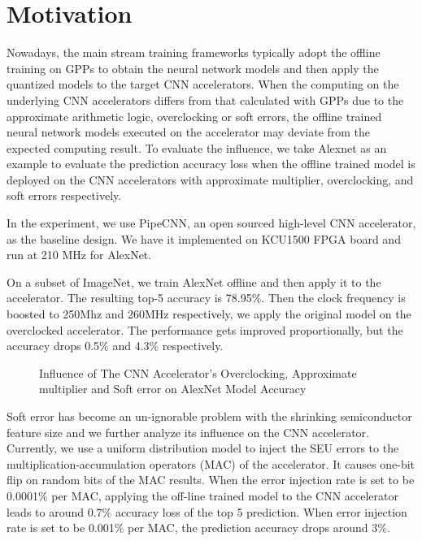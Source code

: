\section{Motivation} \label{sec:motivation}
Nowadays, the main stream training frameworks typically adopt the offline training
on GPPs to obtain the neural network models and then apply the quantized models to the 
target CNN accelerators. When the computing on the underlying CNN accelerators differs
from that calculated with GPPs due to the approximate arithmetic logic, overclocking or 
soft errors, the offline trained neural network models executed on the accelerator 
may deviate from the expected computing result. To evaluate the influence, 
we take Alexnet as an example to evaluate the prediction 
accuracy loss when the offline trained model is deployed on the CNN 
accelerators with approximate multiplier, overclocking, and soft errors respectively. 

In the experiment, we use PipeCNN\cite{pipecnn_2}, an open sourced high-level CNN accelerator, 
as the baseline design. We have it implemented 
on KCU1500 FPGA board and run at 210 MHz for AlexNet. 

On a subset of ImageNet, we train AlexNet offline 
and then apply it to the accelerator. The resulting top-5 accuracy is 78.95\%. Then the clock 
frequency is boosted to 250Mhz and 260MHz respectively, we apply the original model on 
the overclocked accelerator. The performance gets improved proportionally, but the 
accuracy drops 0.5\% and 4.3\% respectively.

\begin{figure}
        \caption{Influence of The CNN Accelerator’s Overclocking, Approximate multiplier and Soft error on AlexNet Model Accuracy}
        \label{fig:retrain}
\end{figure}

  Soft error has become an un-ignorable problem with the shrinking semiconductor 
feature size and we further analyze its influence on the CNN accelerator. 
Currently, we use a uniform distribution model to inject the SEU errors to the 
multiplication-accumulation operators (MAC) of the accelerator. It causes one-bit 
flip on random bits of the MAC results. When the error injection rate is set to 
be 0.0001\% per MAC, applying the off-line trained model to the CNN accelerator 
leads to around 0.7\% accuracy loss of the top 5 prediction. When error injection 
rate is set to be 0.001\% per MAC, the prediction accuracy drops around 3\%.

